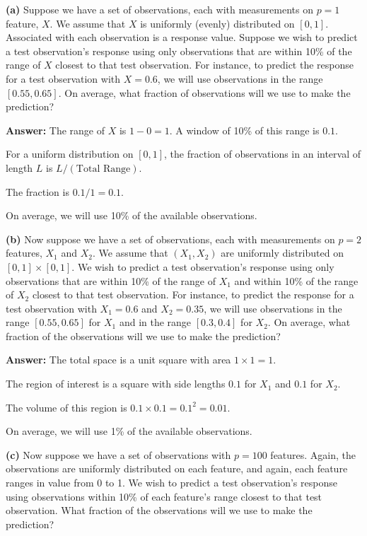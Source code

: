 \documentclass[
]{article}
\begin{document}
\textbf{(a)} Suppose we have a set of observations, each with
measurements on \(p = 1\) feature, \(X\). We assume that \(X\) is
uniformly (evenly) distributed on \([0,1]\). Associated with each
observation is a response value. Suppose we wish to predict a test
observation's response using only observations that are within 10\% of
the range of \(X\) closest to that test observation. For instance, to
predict the response for a test observation with \(X = 0.6\), we will
use observations in the range \([0.55, 0.65]\). On average, what
fraction of observations will we use to make the prediction?

\textbf{Answer:} The range of \(X\) is \(1-0=1\). A window of 10\% of
this range is \(0.1\).

For a uniform distribution on \([0,1]\), the fraction of observations in
an interval of length \(L\) is \(L/(\text{Total Range})\).

The fraction is \(0.1 / 1 = \mathbf{0.1}\).

On average, we will use 10\% of the available observations.

\textbf{(b)} Now suppose we have a set of observations, each with
measurements on \(p = 2\) features, \(X_1\) and \(X_2\). We assume that
\((X_1,X_2)\) are uniformly distributed on \([0,1] \times [0,1]\). We
wish to predict a test observation's response using only observations
that are within 10\% of the range of \(X_1\) and within 10\% of the
range of \(X_2\) closest to that test observation. For instance, to
predict the response for a test observation with \(X_1 = 0.6\) and
\(X_2 = 0.35\), we will use observations in the range \([0.55,0.65]\)
for \(X_1\) and in the range \([0.3,0.4]\) for \(X_2\). On average, what
fraction of the observations will we use to make the prediction?

\textbf{Answer:} The total space is a unit square with area
\(1 \times 1 = 1\).

The region of interest is a square with side lengths \(0.1\) for \(X_1\)
and \(0.1\) for \(X_2\).

The volume of this region is \(0.1 \times 0.1 = 0.1^2 = \mathbf{0.01}\).

On average, we will use 1\% of the available observations.

\textbf{(c)} Now suppose we have a set of observations with \(p = 100\)
features. Again, the observations are uniformly distributed on each
feature, and again, each feature ranges in value from 0 to 1. We wish to
predict a test observation's response using observations within 10\% of
each feature's range closest to that test observation. What fraction of
the observations will we use to make the prediction?
\end{document}

